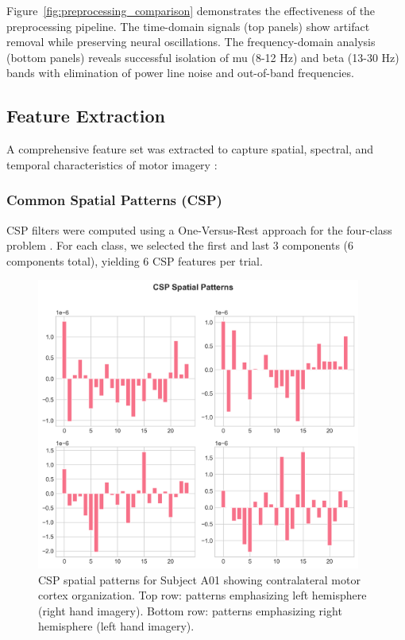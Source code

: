 \documentclass[11pt]{article}
\begin{document}
Figure~\ref{fig:preprocessing_comparison} demonstrates the effectiveness of the preprocessing pipeline. The time-domain signals (top panels) show artifact removal while preserving neural oscillations. The frequency-domain analysis (bottom panels) reveals successful isolation of mu (8-12 Hz) and beta (13-30 Hz) bands with elimination of power line noise and out-of-band frequencies.

\subsection{Feature Extraction}

A comprehensive feature set was extracted to capture spatial, spectral, and temporal characteristics of motor imagery \citep{lotte2018review}:

\subsubsection{Common Spatial Patterns (CSP)}

CSP filters were computed using a One-Versus-Rest approach for the four-class problem \citep{ramoser2000optimal}. For each class, we selected the first and last 3 components (6 components total), yielding 6 CSP features per trial.

\begin{figure}[H]
    \centering
    \includegraphics[width=0.95\textwidth]{../results/figures/03_csp_spatial_patterns.png}
    \caption{CSP spatial patterns for Subject A01 showing contralateral motor cortex organization. Top row: patterns emphasizing left hemisphere (right hand imagery). Bottom row: patterns emphasizing right hemisphere (left hand imagery).}
    \label{fig:csp_patterns}
\end{figure}
\end{document}

